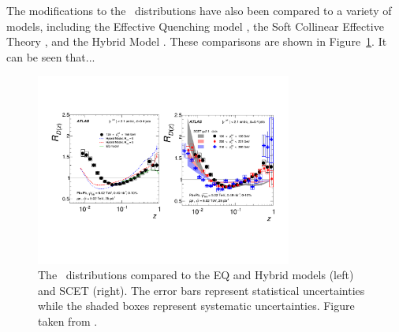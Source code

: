 The modifications to the \Dz\ distributions have also been compared to a variety of models, including the Effective Quenching model \cite{Spousta:2015fca}, the Soft Collinear Effective Theory \cite{Chien:2015vja, Kang:2017frl}, and the Hybrid Model \cite{Casalderrey-Solana:2014bpa}.
These comparisons are shown in Figure~\ref{fig:jetff_rdz_theory}.
It can be seen that...


\begin{figure}[htbp]
\begin{center}
\includegraphics[width=0.75\textwidth]{figures/jetMeasurements/jetff_rdz_theory}
\caption{The \Rdz\ distributions compared to the EQ and Hybrid models (left) and SCET (right).
The error bars represent statistical uncertainties while the shaded boxes represent systematic uncertainties.
Figure taken from \cite{PhysRevC.98.024908}.}
\label{fig:jetff_rdz_theory}
\end{center}
\end{figure}



